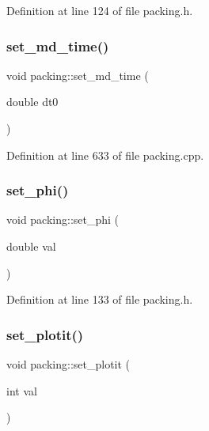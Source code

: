 Definition at line 124 of file packing.\+h.

\mbox{\label{classpacking_aab96c0f738b9ff52cf5eb9deba301387}} 
\subsubsection{\texorpdfstring{set\+\_\+md\+\_\+time()}{set\_md\_time()}}
{\footnotesize\ttfamily void packing\+::set\+\_\+md\+\_\+time (\begin{DoxyParamCaption}\item[{double}]{dt0 }\end{DoxyParamCaption})}



Definition at line 633 of file packing.\+cpp.

\mbox{\label{classpacking_af02fd953055fe009e6d3e79cc7a22eb8}} 
\subsubsection{\texorpdfstring{set\+\_\+phi()}{set\_phi()}}
{\footnotesize\ttfamily void packing\+::set\+\_\+phi (\begin{DoxyParamCaption}\item[{double}]{val }\end{DoxyParamCaption})\hspace{0.3cm}{\ttfamily [inline]}}



Definition at line 133 of file packing.\+h.

\mbox{\label{classpacking_a9bfa5637ac07f61d5cd34655c3a36455}} 
\subsubsection{\texorpdfstring{set\+\_\+plotit()}{set\_plotit()}}
{\footnotesize\ttfamily void packing\+::set\+\_\+plotit (\begin{DoxyParamCaption}\item[{int}]{val }\end{DoxyParamCaption})\hspace{0.3cm}{\ttfamily [inline]}}



